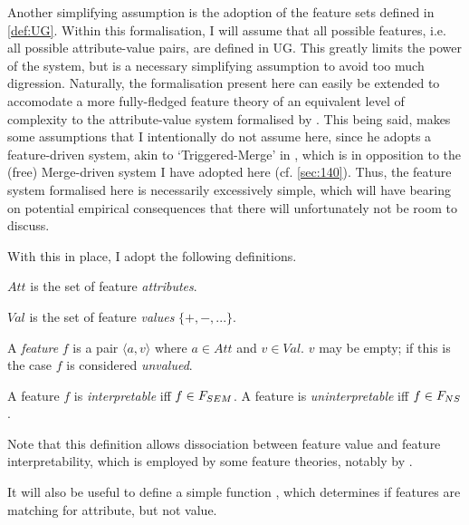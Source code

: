 Another simplifying assumption is the adoption of the feature sets defined in \autoref{def:UG}. Within this formalisation, I will assume that all possible features, i.e. all possible attribute-value pairs, are defined in UG. This greatly limits the power of the system, but is a necessary simplifying assumption to avoid too much digression. Naturally, the formalisation present here can easily be extended to accomodate a more fully-fledged feature theory of an equivalent level of complexity to the attribute-value system formalised by \textcite{AdgerD_2006,AdgerD_2010}. This being said, \textcite{AdgerD_2010} makes some assumptions that I intentionally do not assume here, since he adopts a feature-driven system, akin to `Triggered-Merge' in \CS, which is in opposition to the (free) Merge-driven system I have adopted here (cf. \autoref{sec:140}). Thus, the feature system formalised here is necessarily excessively simple, which will have bearing on potential empirical consequences that there will unfortunately not be room to discuss.

With this in place, I adopt the following definitions.

\begin{definition}
    $Att$ is the set of feature \textit{attributes}.
\end{definition}

\begin{definition}
    $Val$ is the set of feature \textit{values} $\{+, -, ...\}$.
\end{definition}

\begin{definition}
    A \textit{feature} $f$ is a pair $\langle a, v \rangle$ where $a \in Att$ and $v \in Val$. $v$ may be empty; if this is the case $f$ is considered \textit{unvalued}.
\end{definition}

\begin{definition}
    A feature $f$ is \textit{interpretable} iff $f \in F_{SEM}$. A feature is \textit{uninterpretable} iff $f \in F_{NS}$.
\end{definition}
\noindent
Note that this definition allows dissociation between feature value and feature interpretability, which is employed by some feature theories, notably by \textcite{PesetskyD.TorregoE_2007}.

It will also be useful to define a simple function \Match, which determines if features are matching for attribute, but not value.

